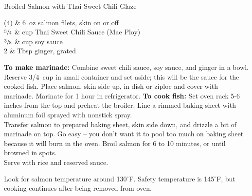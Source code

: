 \setHeadlines
{
}

\begin{recipe}
[ %
    source = CTB prepped meal,
]
{Broiled Salmon with Thai Sweet Chili Glaze}
    
    \ingredients
    {
		(4) & 6~oz salmon filets, skin on or off \\
		$\sfrac{3}{4}$ & cup Thai Sweet Chili Sauce (Mae Ploy) \\
		$\sfrac{3}{8}$ & cup soy sauce \\
		2 & Tbsp ginger, grated \\
    }
    
    \preparation
    {
        \step \textbf{To make marinade:} Combine sweet chili sauce, soy sauce, and ginger in a bowl. Reserve 3/4~cup in small container and set aside; this will be the sauce for the cooked fish.
		\step Place salmon, skin side up, in dish or ziploc and cover with marinade. Marinate for 1 hour in refrigerator.
		\step \textbf{To cook fish:} Set oven rack 5-6 inches from the top and preheat the broiler. 
		\step Line a rimmed baking sheet with aluminum foil sprayed with nonstick spray. \\
		\step Transfer salmon to prepared baking sheet, skin side down, and drizzle a bit of marinade on top. Go easy -- you don't want it to pool too much on baking sheet because it will burn in the oven. 
		\step Broil salmon for 6 to 10 minutes, or until browned in spots. \\
		\step Serve with rice and reserved sauce. 
    }
	
	\hint
	{
		Look for salmon temperature around 130$^{\circ}$F. Safety temperature is 145$^{\circ}$F, but cooking continues after being removed from oven. 
	}

\end{recipe}
